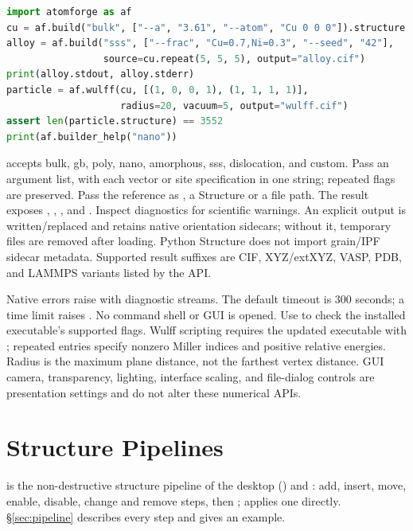 \begin{lstlisting}[language=Python]
import atomforge as af
cu = af.build("bulk", ["--a", "3.61", "--atom", "Cu 0 0 0"]).structure
alloy = af.build("sss", ["--frac", "Cu=0.7,Ni=0.3", "--seed", "42"],
                 source=cu.repeat(5, 5, 5), output="alloy.cif")
print(alloy.stdout, alloy.stderr)
particle = af.wulff(cu, [(1, 0, 0, 1), (1, 1, 1, 1)],
                    radius=20, vacuum=5, output="wulff.cif")
assert len(particle.structure) == 3552
print(af.builder_help("nano"))
\end{lstlisting}

 accepts bulk, gb, poly, nano, amorphous, sss, dislocation, and custom. Pass an argument list, with each vector or site specification in one string; repeated flags are preserved. Pass the reference as , a Structure or a file path. The result exposes , , , and . Inspect diagnostics for scientific warnings. An explicit output is written/replaced and retains native orientation sidecars; without it, temporary files are removed after loading. Python Structure does not import grain/IPF sidecar metadata. Supported result suffixes are CIF, XYZ/extXYZ, VASP, PDB, and LAMMPS variants listed by the API.

Native errors raise  with diagnostic streams. The default timeout is 300 seconds; a time limit raises . No command shell or GUI is opened. Use  to check the installed executable's supported flags. Wulff scripting requires the updated executable with ; repeated  entries specify nonzero Miller indices and positive relative energies. Radius is the maximum plane distance, not the farthest vertex distance. GUI camera, transparency, lighting, interface scaling, and file-dialog controls are presentation settings and do not alter these numerical APIs.

\section{Structure Pipelines}
 is the non-destructive structure pipeline of the desktop () and : add, insert, move, enable, disable, change and remove steps, then ;  applies one directly. \S\ref{sec:pipeline} describes every step and gives an example.

